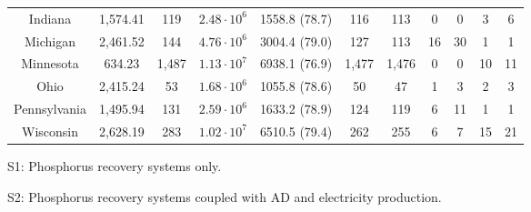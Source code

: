 \documentclass[authoryear]{elsarticle}
\begin{document}
\begin{table}[h]
\begin{threeparttable}
{\begin{tabular}{@{}ccccccccccc@{}}
				Indiana           & 1,574.41                                                                                        & 119                                                                         & $2.48 \cdot 10^6$ & 1558.8 (78.7)                            & 116               & 113               & 0               & 0               & 3               & 6               \\
				Michigan          & 2,461.52                                                                                        & 144                                                                        & $4.76 \cdot 10^6$ & 3004.4 (79.0)                                                                               & 127              & 113               & 16              & 30              & 1               & 1               \\
				Minnesota         & 634.23                                                                                        & 1,487                                                                         & $1.13 \cdot 10^7$ & 6938.1 (76.9)                                                                                & 1,477                & 1,476                & 0               & 0               & 10              & 11              \\
				Ohio              & 2,415.24                                                                                        & 53                                                                         & $1.68 \cdot 10^6$ & 1055.8   (78.6)                                                                              & 50               & 47               & 1               & 3               & 2               & 3               \\
				Pennsylvania      & 1,495.94                                                                                        & 131                                                                         & $2.59 \cdot 10^6$ & 1633.2  (78.9)                                                                              & 124               & 119               & 6               & 11              & 1               & 1               \\
				Wisconsin         & 2,628.19                                                                                        & 283                                                                        & $1.02 \cdot 10^7$ & 6510.5 (79.4)                                                                               & 262              & 255              & 6               & 7              & 15              & 21              \\ \bottomrule
		\end{tabular}}
		\begin{tablenotes}
			\item S1: Phosphorus recovery systems only.
			\item S2: Phosphorus recovery systems coupled with AD and electricity production.
		\end{tablenotes}
	\end{threeparttable}
\end{table}
		
\end{document}
